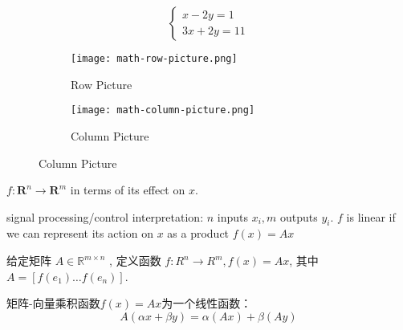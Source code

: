 \begin{example}
    \label{exm: row-column-picture}
    \begin{equation}\left\{\begin{matrix} 
        
        x - 2y=1 \\  
        3x+2y=11 
      \end{matrix}\right. \end{equation}




   
\begin{figure}[htbp]
        \caption{Row Picture and Column Picture for \ref{exm: row-column-picture}}
    \begin{subfigure}[b]{0.8\textwidth}
        \centering
        \caption{Row Picture}
    \texttt{[image: math-row-picture.png]}
    \end{subfigure}

   
    \begin{subfigure}[b]{0.8\textwidth}
        \centering
        \caption{Column Picture}
    \texttt{[image: math-column-picture.png]}
    \end{subfigure}
\end{figure}
\end{example}

$ f: \mathbf{R}^{n} \rightarrow \mathbf{R}^{m} $ in terms of its effect on $ x $. 

signal processing/control interpretation: $ n $ inputs $ x_{i}, m $ outputs $ y_{i} $. $ f $ is linear if we can represent its action on $ x $ as a product $ f(x)=A x $

\begin{definition}[矩阵-向量乘积函数 $f(x)=A x$]
    给定矩阵 $ A \in \mathbb{R}^{m \times n} $ , 定义函数 $ f: R^{n} \rightarrow R^{m}, f(x)=A x $, 其中 $ A=\left[f\left(e_{1}\right) \ldots f\left(e_{n}\right)\right] $.
    
\end{definition}

\begin{theorem}
    矩阵-向量乘积函数$f(x)=A x$为一个线性函数： \begin{equation} A(\alpha x+\beta y)=\alpha(A x)+\beta(A y) \end{equation}
\end{theorem}

